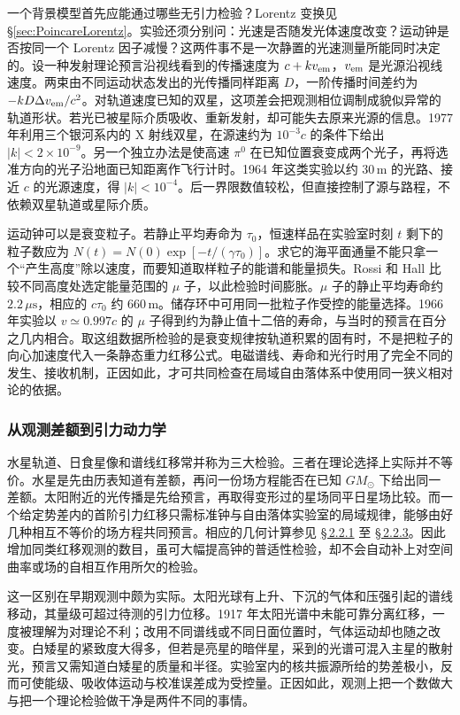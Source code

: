 一个背景模型首先应能通过哪些无引力检验？Lorentz 变换见 \S\ref{sec:PoincareLorentz}。实验还须分别问：光速是否随发光体速度改变？运动钟是否按同一个 Lorentz 因子减慢？这两件事不是一次静置的光速测量所能同时决定的。设一种发射理论预言沿视线看到的传播速度为 $c+kv_{\rm em}$，$v_{\rm em}$ 是光源沿视线速度。两束由不同运动状态发出的光传播同样距离 $D$，一阶传播时间差约为 $-kD\Delta v_{\rm em}/c^2$。对轨道速度已知的双星，这项差会把观测相位调制成貌似异常的轨道形状。若光已被星际介质吸收、重新发射，却可能失去原来光源的信息。1977 年利用三个银河系内的 X 射线双星，在源速约为 $10^{-3}c$ 的条件下给出 $|k|<2\times10^{-9}$。另一个独立办法是使高速 $\pi^0$ 在已知位置衰变成两个光子，再将选准方向的光子沿地面已知距离作飞行计时。1964 年这类实验以约 $30\,\mathrm m$ 的光路、接近 $c$ 的光源速度，得 $|k|<10^{-4}$。后一界限数值较松，但直接控制了源与路程，不依赖双星轨道或星际介质。

运动钟可以是衰变粒子。若静止平均寿命为 $\tau_0$，恒速样品在实验室时刻 $t$ 剩下的粒子数应为 $N(t)=N(0)\exp[-t/(\gamma\tau_0)]$。求它的海平面通量不能只拿一个“产生高度”除以速度，而要知道取样粒子的能谱和能量损失。Rossi 和 Hall 比较不同高度处选定能量范围的 $\mu$ 子，以此检验时间膨胀。$\mu$ 子的静止平均寿命约 $2.2\,\mu\mathrm s$，相应的 $c\tau_0$ 约 $660\,\mathrm m$。储存环中可用同一批粒子作受控的能量选择。1966 年实验以 $v\simeq0.997c$ 的 $\mu$ 子得到约为静止值十二倍的寿命，与当时的预言在百分之几内相合。取这组数据所检验的是衰变规律按轨道积累的固有时，不是把粒子的向心加速度代入一条静态重力红移公式。电磁谱线、寿命和光行时用了完全不同的发生、接收机制，正因如此，才可共同检查在局域自由落体系中使用同一狭义相对论的依据。

\subsubsection{从观测差额到引力动力学}

水星轨道、日食星像和谱线红移常并称为三大检验。三者在理论选择上实际并不等价。水星是先由历表知道有差额，再问一份场方程能否在已知 $GM_\odot$ 下给出同一差额。太阳附近的光传播是先给预言，再取得变形过的星场同平日星场比较。而一个给定势差内的首阶引力红移只需标准钟与自由落体实验室的局域规律，能够由好几种相互不等价的场方程共同预言。相应的几何计算参见 \hyperlink{subsection.2.2.1}{\S\,2.2.1} 至 \hyperlink{subsection.2.2.3}{\S\,2.2.3}。因此增加同类红移观测的数目，虽可大幅提高钟的普适性检验，却不会自动补上对空间曲率或场的自相互作用所欠的检验。

这一区别在早期观测中颇为实际。太阳光球有上升、下沉的气体和压强引起的谱线移动，其量级可超过待测的引力位移。1917 年太阳光谱中未能可靠分离红移，一度被理解为对理论不利；改用不同谱线或不同日面位置时，气体运动却也随之改变。白矮星的紧致度大得多，但若是亮星的暗伴星，采到的光谱可混入主星的散射光，预言又需知道白矮星的质量和半径。实验室内的核共振源所给的势差极小，反而可使能级、吸收体运动与校准误差成为受控量。正因如此，观测上把一个数做大与把一个理论检验做干净是两件不同的事情。

